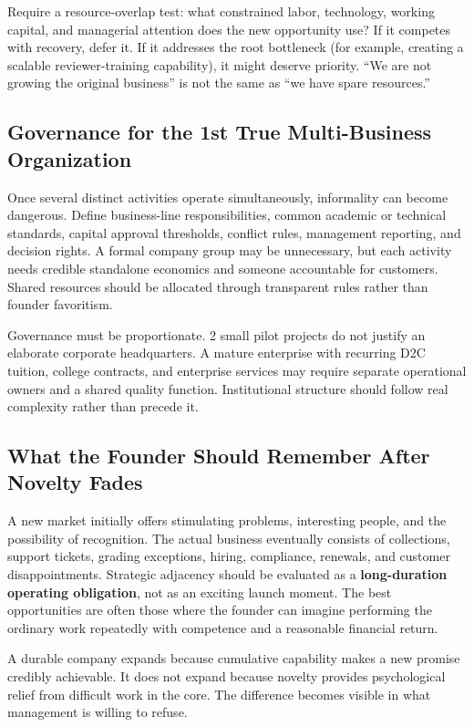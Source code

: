 Require a resource-overlap test: what constrained labor, technology, working capital, and managerial attention does the new opportunity use? If it competes with recovery, defer it. If it addresses the root bottleneck (for example, creating a scalable reviewer-training capability), it might deserve priority. ``We are not growing the original business'' is not the same as ``we have spare resources.''

\subsection{Governance for the 1st True Multi-Business Organization}
\label{sec:governance_first_multibusiness_organization}

Once several distinct activities operate simultaneously, informality can become dangerous. Define business-line responsibilities, common academic or technical standards, capital approval thresholds, conflict rules, management reporting, and decision rights. A formal company group may be unnecessary, but each activity needs credible standalone economics and someone accountable for customers. Shared resources should be allocated through transparent rules rather than founder favoritism.

Governance must be proportionate. 2 small pilot projects do not justify an elaborate corporate headquarters. A mature enterprise with recurring D2C tuition, college contracts, and enterprise services may require separate operational owners and a shared quality function. Institutional structure should follow real complexity rather than precede it.

\subsection{What the Founder Should Remember After Novelty Fades}
\label{sec:what_founder_remembers_after_novelty_fades}

A new market initially offers stimulating problems, interesting people, and the possibility of recognition. The actual business eventually consists of collections, support tickets, grading exceptions, hiring, compliance, renewals, and customer disappointments. Strategic adjacency should be evaluated as a \textbf{long-duration operating obligation}, not as an exciting launch moment. The best opportunities are often those where the founder can imagine performing the ordinary work repeatedly with competence and a reasonable financial return.

A durable company expands because cumulative capability makes a new promise credibly achievable. It does not expand because novelty provides psychological relief from difficult work in the core. The difference becomes visible in what management is willing to refuse.
